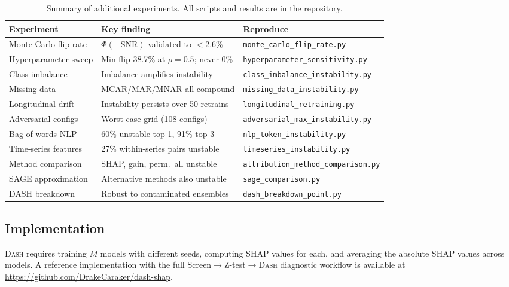 \documentclass{jmlr}
\newcommand{\DASH}{\textsc{Dash}}
\begin{document}
\begin{table}[t]
\centering
\caption{Summary of additional experiments. All scripts and results are in the repository.}
\label{tab:experiment-summary}
\footnotesize
\begin{tabular}{@{}lp{4.2cm}l@{}}
\toprule
Experiment & Key finding & Reproduce \\
\midrule
Monte Carlo flip rate & $\Phi(-\text{SNR})$ validated to $<$2.6\% & \texttt{monte\_carlo\_flip\_rate.py} \\
Hyperparameter sweep & Min flip 38.7\% at $\rho{=}0.5$; never 0\% & \texttt{hyperparameter\_sensitivity.py} \\
Class imbalance & Imbalance amplifies instability & \texttt{class\_imbalance\_instability.py} \\
Missing data & MCAR/MAR/MNAR all compound & \texttt{missing\_data\_instability.py} \\
Longitudinal drift & Instability persists over 50 retrains & \texttt{longitudinal\_retraining.py} \\
Adversarial configs & Worst-case grid (108 configs) & \texttt{adversarial\_max\_instability.py} \\
Bag-of-words NLP & 60\% unstable top-1, 91\% top-3 & \texttt{nlp\_token\_instability.py} \\
Time-series features & 27\% within-series pairs unstable & \texttt{timeseries\_instability.py} \\
Method comparison & SHAP, gain, perm.\ all unstable & \texttt{attribution\_method\_comparison.py} \\
SAGE approximation & Alternative methods also unstable & \texttt{sage\_comparison.py} \\
DASH breakdown & Robust to contaminated ensembles & \texttt{dash\_breakdown\_point.py} \\
\bottomrule
\end{tabular}
\end{table}

\subsection{Implementation}
\label{sec:quickstart}

\DASH{} requires training $M$ models with different seeds, computing SHAP values for each, and averaging the absolute SHAP values across models. A reference implementation with the full Screen$\to$Z-test$\to$\DASH{} diagnostic workflow is available at \url{https://github.com/DrakeCaraker/dash-shap}.
\end{document}
